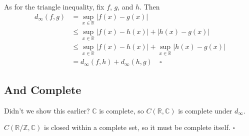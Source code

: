 \documentclass[12pt]{article}
\newcommand{\R}{\mathbb{R}}
\newcommand{\Z}{\mathbb{Z}}
\newcommand{\C}{\mathbb{C}}
\begin{document}
As for the triangle inequality, fix $f$, $g$, and $h$.
Then
\begin{align*}
  d_\infty(f, g)
  &= \sup_{x \in \R} |f(x)-g(x)| \\
  &\le \sup_{x \in \R} |f(x)-h(x)|+|h(x)-g(x)| \\
  &\le \sup_{x \in \R} |f(x)-h(x)| + \sup_{x \in \R} |h(x)-g(x)| \\
  &= d_\infty(f, h) + d_\infty(h, g)\quad\square
\end{align*}

\subsection{And Complete}

Didn't we show this earlier?
$\C$ is complete, so $C(\R, \C)$ is complete under $d_\infty$.

$C(\R/\Z, \C)$ is closed within a complete set,
so it must be complete itself. $\square$
\end{document}
